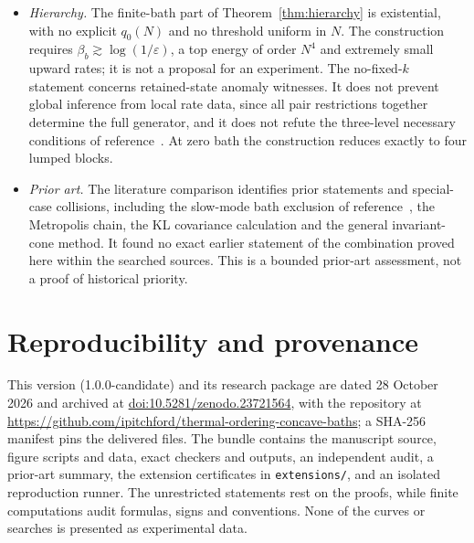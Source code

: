 \documentclass[11pt,a4paper]{article}
\theoremstyle{remark}\newtheorem{remark}[theorem]{Remark}
\begin{document}
\begin{itemize}
\item \emph{Hierarchy.} The finite-bath part of Theorem~\ref{thm:hierarchy} is existential, with no explicit $q_0(N)$ and no threshold uniform in $N$. The construction requires $\beta_b\gtrsim\log(1/\varepsilon)$, a top energy of order $N^4$ and extremely small upward rates; it is not a proposal for an experiment. The no-fixed-$k$ statement concerns retained-state anomaly witnesses. It does not prevent global inference from local rate data, since all pair restrictions together determine the full generator, and it does not refute the three-level necessary conditions of reference~\cite{Avitan2026}. At zero bath the construction reduces exactly to four lumped blocks.
\item \emph{Prior art.} The literature comparison identifies prior statements and special-case collisions, including the slow-mode bath exclusion of reference~\cite{Avitan2026}, the Metropolis chain, the KL covariance calculation and the general invariant-cone method. It found no exact earlier statement of the combination proved here within the searched sources. This is a bounded prior-art assessment, not a proof of historical priority.
\end{itemize}

\section*{Reproducibility and provenance}
This version (1.0.0-candidate) and its research package are dated 28 October 2026 and archived at \href{https://doi.org/10.5281/zenodo.23721564}{doi:10.5281/zenodo.23721564}, with the repository at \url{https://github.com/ipitchford/thermal-ordering-concave-baths}; a SHA-256 manifest pins the delivered files. The bundle contains the manuscript source, figure scripts and data, exact checkers and outputs, an independent audit, a prior-art summary, the extension certificates in \texttt{extensions/}, and an isolated reproduction runner. The unrestricted statements rest on the proofs, while finite computations audit formulas, signs and conventions. None of the curves or searches is presented as experimental data.
\end{document}
